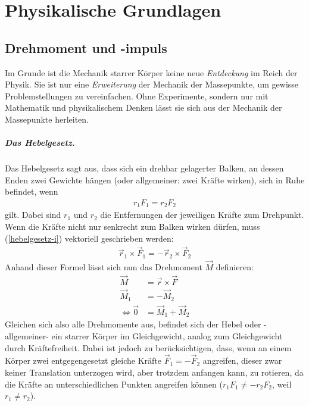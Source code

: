 \chapter{Physikalische Grundlagen}

\section{Drehmoment und -impuls}
Im Grunde ist die Mechanik starrer Körper keine neue \emph{Entdeckung} im Reich der Physik. Sie ist nur eine \emph{Erweiterung} der Mechanik der Massepunkte, um gewisse Problemstellungen zu vereinfachen. Ohne Experimente, sondern nur mit Mathematik und physikalischem Denken lässt sie sich aus der Mechanik der Massepunkte herleiten.

\paragraph{Das Hebelgesetz.}
Das Hebelgesetz sagt aus, dass sich ein drehbar gelagerter Balken, an dessen Enden zwei Gewichte hängen (oder allgemeiner: zwei Kräfte wirken), sich in Ruhe befindet, wenn
\begin{align}
\label{hebelgesetz-i}
r_1 F_1 = r_2 F_2
\end{align}
gilt. Dabei sind $r_1$ und $r_2$ die Entfernungen der jeweiligen Kräfte zum Drehpunkt. Wenn die Kräfte nicht nur senkrecht zum Balken wirken dürfen, muss (\ref{hebelgesetz-i}) vektoriell geschrieben werden:
\begin{align}
\label{hebelgesetz}
\vec r_1\times\vec F_1 =-\vec r_2\times\vec F_2
\end{align}
Anhand dieser Formel lässt sich nun das Drehmoment $\vec M$ definieren:
\begin{align}
\vec M &= \vec r\times\vec F\\
\vec M_1 &= -\vec M_2\\
\Leftrightarrow \vec 0 &=\vec M_1 + \vec M_2
\end{align}
Gleichen sich also alle Drehmomente aus, befindet sich der Hebel oder -allgemeiner- ein starrer Körper im Gleichgewicht, analog zum Gleichgewicht durch Kräftefreiheit. Dabei ist jedoch zu berücksichtigen, dass, wenn an einem Körper zwei entgegengesetzt gleiche Kräfte $\vec F_1=- \vec F_2$ angreifen, dieser zwar keiner Translation unterzogen wird, aber trotzdem anfangen kann, zu rotieren, da die Kräfte an unterschiedlichen Punkten angreifen können ($r_1F_1\not=-r_2F_2$, weil $r_1\not=r_2$).

